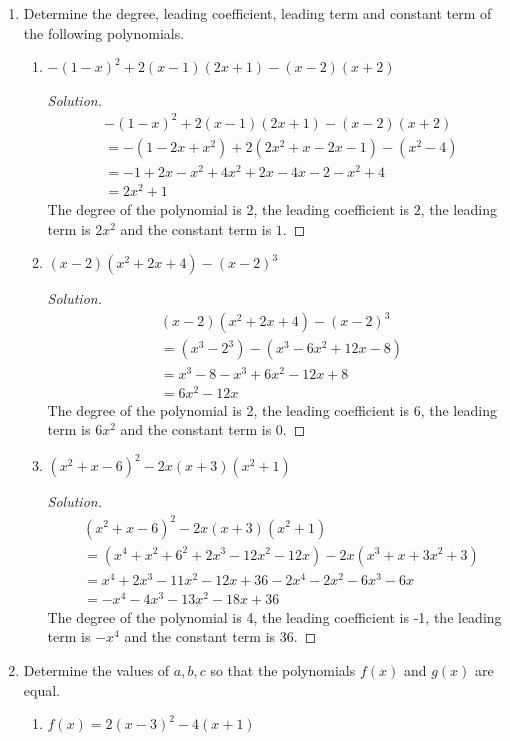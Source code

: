 \documentclass[12pt]{article}
\newenvironment{solution}{\begin{proof}[Solution]}{\end{proof}}
\begin{document}
\begin{enumerate}
		\item Determine the degree, leading coefficient, leading term and constant term of the following polynomials.
		\begin{enumerate}
			\item $-(1-x)^2+2(x-1)(2x+1)-(x-2)(x+2)$
			\begin{solution}
				\begin{align*}
					&-(1-x)^2+2(x-1)(2x+1)-(x-2)(x+2)\\&=-(1-2x+x^2)+2(2x^2+x-2x-1)-(x^2-4)\\
					&=-1+2x-x^2+4x^2+2x-4x-2-x^2+4\\
					&=2x^2+1
				\end{align*}
				The degree of the polynomial is 2, the leading coefficient is $2$, the leading term is $2x^2$ and the constant term is $1$.
			\end{solution}
			\item $(x-2)(x^2+2x+4)-(x-2)^3$
			\begin{solution}
				\begin{align*}
					&(x-2)(x^2+2x+4)-(x-2)^3\\
					&=(x^3-2^3)-(x^3-6x^2+12x-8)\\
					&=x^3-8-x^3+6x^2-12x+8\\
					&=6x^2-12x
				\end{align*}
				The degree of the polynomial is 2, the leading coefficient is 6, the leading term is $6x^2$ and the constant term is $0$.
			\end{solution}
			\item $(x^2+x-6)^2-2x(x+3)(x^2+1)$
			\begin{solution}
				\begin{align*}
					&(x^2+x-6)^2-2x(x+3)(x^2+1)\\
					&=(x^4+x^2+6^2+2x^3-12x^2-12x)-2x(x^3+x+3x^2+3)\\
					&=x^4+2x^3-11x^2-12x+36-2x^4-2x^2-6x^3-6x\\
					&=-x^4-4x^3-13x^2-18x+36
				\end{align*}
				The degree of the polynomial is 4, the leading coefficient is -1, the leading term is $-x^4$ and the constant term is 36.
			\end{solution}
		\end{enumerate}
		
		\item Determine the values of $a,b,c$ so that the polynomials $f(x)$ and $g(x)$ are equal.\begin{enumerate}
			\item 
			$
			f(x)=2(x-3)^2-4(x+1)
			$
			

\end{enumerate}
\end{enumerate}
\end{document}
